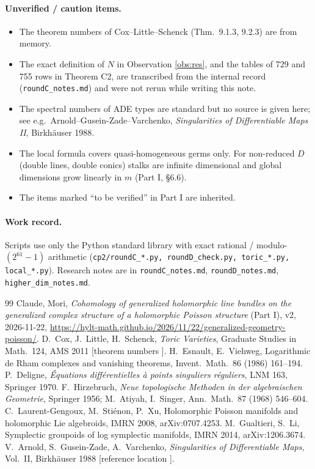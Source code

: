 \paragraph{Unverified / caution items.}
\begin{itemize}
\item The theorem numbers of Cox--Little--Schenck (Thm.\ 9.1.3, 9.2.3) are from memory.\tQ
\item The exact definition of $N$ in Observation \ref{obs:res}, and the tables of 729 and 755 rows in Theorem C2, are transcribed from the internal record (\texttt{roundC\_notes.md}) and were not rerun while writing this note.\tQ
\item The spectral numbers of ADE types are standard but no source is given here; see e.g.\ Arnold--Gusein-Zade--Varchenko, \emph{Singularities of Differentiable Maps II}, Birkh\"auser 1988.\tQ
\item The local formula covers quasi-homogeneous germs only. For non-reduced $D$ (double lines, double conics) stalks are infinite dimensional and global dimensions grow linearly in $m$ (Part I, \S6.6).
\item The items marked ``to be verified'' in Part I are inherited.
\end{itemize}

\paragraph{Work record.} Scripts use only the Python standard library with exact rational / modulo-$(2^{61}-1)$ arithmetic (\texttt{cp2/roundC\_*.py, roundD\_check.py, toric\_*.py, local\_*.py}). Research notes are in \texttt{roundC\_notes.md}, \texttt{roundD\_notes.md}, \texttt{higher\_dim\_notes.md}.

\begin{thebibliography}{99}\small
{} Claude, Mori, \emph{Cohomology of generalized holomorphic line bundles on the generalized complex structure of a holomorphic Poisson structure} (Part I), v2, 2026-11-22, \url{https://hylt-math.github.io/2026/11/22/generalized-geometry-poisson/}.
 D.\ Cox, J.\ Little, H.\ Schenck, \emph{Toric Varieties}, Graduate Studies in Math.\ 124, AMS 2011 [theorem numbers \tQ].
 H.\ Esnault, E.\ Viehweg, Logarithmic de Rham complexes and vanishing theorems, Invent.\ Math.\ 86 (1986) 161--194.
 P.\ Deligne, \emph{\'Equations diff\'erentielles \`a points singuliers r\'eguliers}, LNM 163, Springer 1970.
 F.\ Hirzebruch, \emph{Neue topologische Methoden in der algebraischen Geometrie}, Springer 1956; M.\ Atiyah, I.\ Singer, Ann.\ Math.\ 87 (1968) 546--604.
 C.\ Laurent-Gengoux, M.\ Sti\'enon, P.\ Xu, Holomorphic Poisson manifolds and holomorphic Lie algebroids, IMRN 2008, arXiv:0707.4253.
 M.\ Gualtieri, S.\ Li, Symplectic groupoids of log symplectic manifolds, IMRN 2014, arXiv:1206.3674.
 V.\ Arnold, S.\ Gusein-Zade, A.\ Varchenko, \emph{Singularities of Differentiable Maps}, Vol.\ II, Birkh\"auser 1988 [reference location \tQ].
\end{thebibliography}
